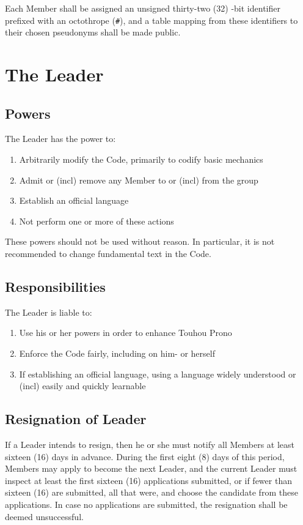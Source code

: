 \documentclass[10pt]{book}
\begin{document}
Each Member shall be assigned an unsigned thirty-two (32) -bit identifier prefixed with an octothrope (\texttt{\#}), and a table mapping from these identifiers to their chosen pseudonyms shall be made public.

\section{The Leader}

\subsection{Powers}

The Leader has the power to:

\begin{enumerate}
 \item Arbitrarily modify the Code, primarily to codify basic mechanics
 \item Admit or (incl) remove any Member to or (incl) from the group
 \item Establish an official language
 \item Not perform one or more of these actions
\end{enumerate}

These powers should not be used without reason. In particular, it is not recommended to change fundamental text in the Code.

\subsection{Responsibilities}

The Leader is liable to:

\begin{enumerate}
 \item Use his or her powers in order to enhance Touhou Prono
 \item Enforce the Code fairly, including on him- or herself
 \item If establishing an official language, using a language widely understood or (incl) easily and quickly learnable
\end{enumerate}

\subsection{Resignation of Leader}

If a Leader intends to resign, then he or she must notify all Members at least sixteen (16) days in advance. During the first eight (8) days of this period, Members may apply to become the next Leader, and the current Leader must inspect at least the first sixteen (16) applications submitted, or if fewer than sixteen (16) are submitted, all that were, and choose the candidate from these applications. In case no applications are submitted, the resignation shall be deemed unsuccessful.
\end{document}
